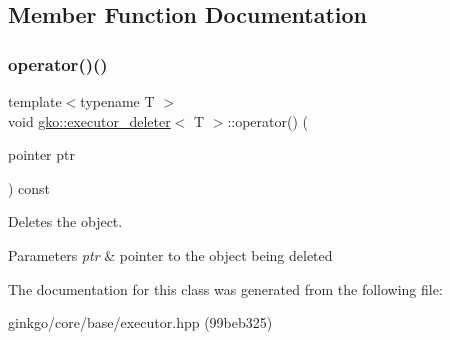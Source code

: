 \subsection{Member Function Documentation}
\mbox{\label{classgko_1_1executor__deleter_aaefa9d9f1c8ae4f4723668d5f946e5c0}} 
\subsubsection{\texorpdfstring{operator()()}{operator()()}}
{\footnotesize\ttfamily template$<$typename T $>$ \\
void \hyperlink{classgko_1_1executor__deleter}{gko\+::executor\+\_\+deleter}$<$ T $>$\+::operator() (\begin{DoxyParamCaption}\item[{pointer}]{ptr }\end{DoxyParamCaption}) const}



Deletes the object. 


\begin{DoxyParams}{Parameters}
{\em ptr} & pointer to the object being deleted \\
\hline
\end{DoxyParams}


The documentation for this class was generated from the following file\+:\begin{DoxyCompactItemize}
\item 
ginkgo/core/base/executor.\+hpp (99beb325)\end{DoxyCompactItemize}
